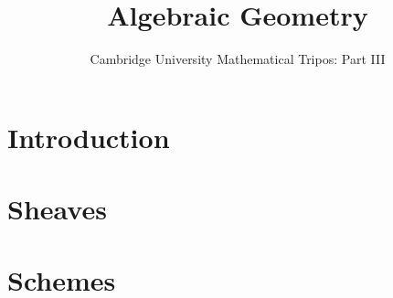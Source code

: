 \documentclass{article}
\title{Algebraic Geometry}
\author{Cambridge University Mathematical Tripos: Part III}
\begin{document}
\maketitle

\tableofcontentsnewpage{}


\section{Introduction}

\section{Sheaves}

\section{Schemes}

\end{document}
